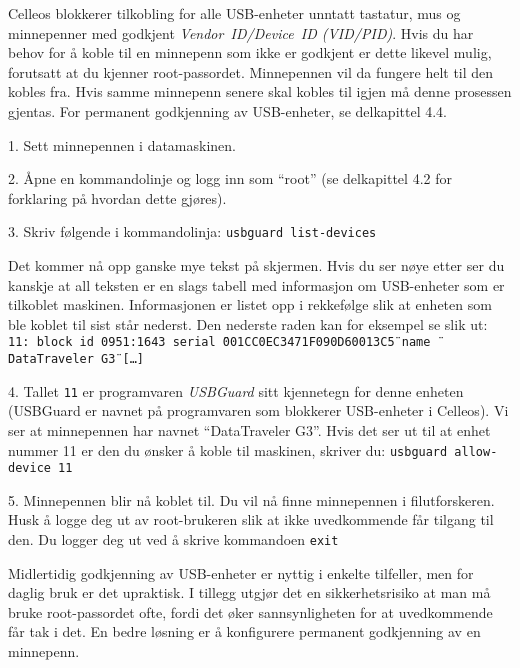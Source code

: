 
Celleos blokkerer tilkobling for alle USB-enheter unntatt tastatur, mus og minnepenner med godkjent {\it Vendor~ID/Device~ID (VID/PID)}. Hvis du har behov for \aa{} koble til en minnepenn som ikke er godkjent er dette likevel mulig, forutsatt at du kjenner root-passordet. Minnepennen vil da fungere helt til den kobles fra. Hvis samme minnepenn senere skal kobles til igjen m\aa{} denne prosessen gjentas. For permanent godkjenning av USB-enheter, se delkapittel 4.4.
\item{1.} Sett minnepennen i datamaskinen.
\item{2.} \AA pne en kommandolinje og logg inn som ``root'' (se delkapittel 4.2 for forklaring p\aa{} hvordan dette gj\o res).
\item{3.} Skriv f\o lgende i kommandolinja:
\medskip
{\tt usbguard list-devices}
\medskip
\item{} Det kommer n\aa{} opp ganske mye tekst p\aa{} skjermen. Hvis du ser n\o ye etter ser du kanskje at all teksten er en slags tabell med informasjon om USB-enheter som er tilkoblet maskinen. Informasjonen er listet opp i rekkef\o lge slik at enheten som ble koblet til sist st\aa r nederst. Den nederste raden kan for eksempel se slik ut:
\medskip
{\tt 11: block id 0951:1643 serial \"{}001CC0EC3471F090D60013C5\"{} name \"{}DataTraveler G3\"{}{} [\dots]}
\medskip
\item{4. } Tallet {\tt 11} er programvaren {\it USBGuard} sitt kjennetegn for denne enheten (USBGuard er navnet p\aa{} programvaren som blokkerer USB-enheter i Celleos). Vi ser at minnepennen har navnet ``DataTraveler G3''. Hvis det ser ut til at enhet nummer 11 er den du \o nsker \aa{} koble til maskinen, skriver du:
\medskip
{\tt usbguard allow-device 11}
\medskip
\item{5.} Minnepennen blir n\aa{} koblet til. Du vil n\aa{} finne minnepennen i filutforskeren. Husk \aa{} logge deg ut av root-brukeren slik at ikke uvedkommende f\aa r tilgang til den. Du logger deg ut ved \aa{} skrive kommandoen
\medskip
{\tt exit}
\medskip


Midlertidig godkjenning av USB-enheter er nyttig i enkelte tilfeller, men for daglig bruk er det upraktisk. I tillegg utgj\o r det en sikkerhetsrisiko at man m\aa{} bruke root-passordet ofte, fordi det \o ker sannsynligheten for at uvedkommende f\aa r tak i det. En bedre l\o sning er \aa{} konfigurere permanent godkjenning av en minnepenn.

